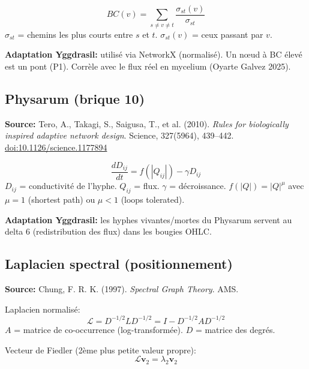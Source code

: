\documentclass[11pt,a4paper]{article}
\begin{document}
\begin{equation}
BC(v) = \sum_{s \neq v \neq t} \frac{\sigma_{st}(v)}{\sigma_{st}}
\end{equation}
$\sigma_{st}$ = chemins les plus courts entre $s$ et $t$.
$\sigma_{st}(v)$ = ceux passant par $v$.

\textbf{Adaptation Yggdrasil:} utilis\'e via NetworkX (normalis\'e). Un n\oe ud \`a BC \'elev\'e
est un pont (P1). Corr\`ele avec le flux r\'eel en mycelium (Oyarte Galvez 2025).

\subsection{Physarum (brique 10)}

\textbf{Source:} Tero, A., Takagi, S., Saigusa, T., et al. (2010).
\textit{Rules for biologically inspired adaptive network design}.
Science, 327(5964), 439--442.
\href{https://doi.org/10.1126/science.1177894}{doi:10.1126/science.1177894}

\begin{equation}
\frac{dD_{ij}}{dt} = f(|Q_{ij}|) - \gamma D_{ij}
\end{equation}
$D_{ij}$ = conductivit\'e de l'hyphe. $Q_{ij}$ = flux. $\gamma$ = d\'ecroissance.
$f(|Q|) = |Q|^\mu$ avec $\mu = 1$ (shortest path) ou $\mu < 1$ (loops tolerated).

\textbf{Adaptation Yggdrasil:} les hyphes vivantes/mortes du Physarum servent
au delta 6 (redistribution des flux) dans les bougies OHLC.

\subsection{Laplacien spectral (positionnement)}

\textbf{Source:} Chung, F. R. K. (1997).
\textit{Spectral Graph Theory}. AMS.

Laplacien normalis\'e:
\begin{equation}
\mathcal{L} = D^{-1/2} L D^{-1/2} = I - D^{-1/2} A D^{-1/2}
\end{equation}
$A$ = matrice de co-occurrence (log-transform\'ee). $D$ = matrice des degr\'es.

Vecteur de Fiedler (2\`eme plus petite valeur propre):
\begin{equation}
\mathcal{L} \mathbf{v}_2 = \lambda_2 \mathbf{v}_2
\end{equation}
\end{document}
